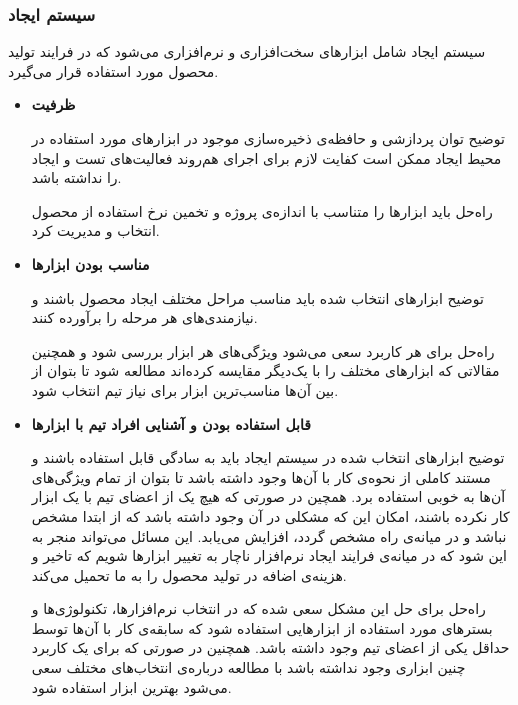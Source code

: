 \subsubsection{سیستم ایجاد}

سیستم ایجاد شامل ابزارهای سخت‌افزاری و نرم‌افزاری می‌شود که در فرایند تولید محصول مورد استفاده قرار می‌گیرد.

\begin{itemize}
	
\item 
\textbf{ظرفیت}


توضیح \hspace*{1cm} 
توان پردازشی و حافظه‌ی ذخیره‌سازی موجود در ابزارهای مورد استفاده در محیط ایجاد ممکن است کفایت لازم برای اجرای هم‌روند فعالیت‌های تست و ایجاد را نداشته باشد.

راه‌حل \hspace*{1cm} 
باید ابزارها را متناسب با اندازه‌ی پروژه و تخمین نرخ استفاده از محصول انتخاب و مدیریت کرد.
	
\item 
\textbf{مناسب بودن ابزارها}


توضیح \hspace*{1cm} 
ابزارهای انتخاب شده باید مناسب مراحل مختلف ایجاد محصول باشند و نیازمندی‌های هر مرحله را برآورده کنند.

راه‌حل \hspace*{1cm} 
برای هر کاربرد سعی می‌شود ویژگی‌های هر ابزار بررسی شود و همچنین مقالاتی که ابزارهای مختلف را با یک‌دیگر مقایسه کرده‌اند مطالعه شود تا بتوان از بین آن‌ها مناسب‌ترین ابزار برای نیاز تیم انتخاب شود.

\item 
\textbf{قابل استفاده بودن و آشنایی افراد تیم با ابزارها}


توضیح \hspace*{1cm} 
ابزارهای انتخاب شده در سیستم ایجاد باید به سادگی قابل استفاده باشند و مستند کاملی از نحوه‌ی کار با آن‌ها وجود داشته باشد تا بتوان از تمام ویژگی‌های آن‌ها به خوبی استفاده برد.
همچین در صورتی که هیچ یک از اعضای تیم با یک ابزار کار نکرده باشند، امکان این که مشکلی در آن وجود داشته باشد که از ابتدا مشخص نباشد و در میانه‌ی راه مشخص گردد، افزایش می‌یابد. 
این مسائل می‌تواند منجر به این شود که در میانه‌ی فرایند ایجاد نرم‌افزار ناچار به تغییر ابزارها شویم که تاخیر و هزینه‌ی اضافه در تولید محصول را به ما تحمیل می‌کند.

راه‌حل \hspace*{1cm} 
برای حل این مشکل سعی شده که در انتخاب نرم‌افزار‌ها، تکنولوژی‌ها و بسترهای مورد استفاده از ابزارهایی استفاده شود که سابقه‌ی کار با آن‌ها توسط حداقل یکی از اعضای تیم وجود داشته باشد. همچنین در صورتی که برای یک کاربرد چنین ابزاری وجود نداشته باشد با مطالعه درباره‌ی انتخاب‌های مختلف سعی می‌شود بهترین ابزار استفاده شود.


\end{itemize}
